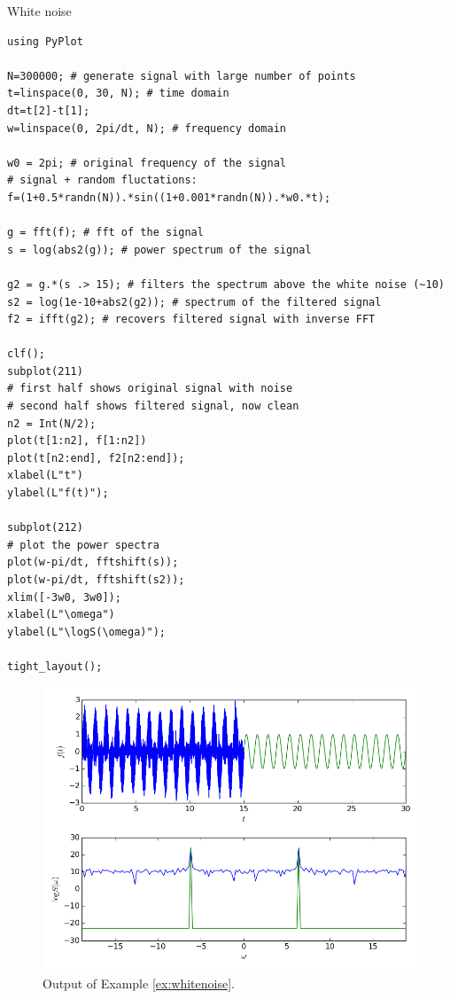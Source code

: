 \begin{example}{White noise}
\label{ex:whitenoise}
\begin{verbatim}
using PyPlot

N=300000; # generate signal with large number of points
t=linspace(0, 30, N); # time domain
dt=t[2]-t[1];
w=linspace(0, 2pi/dt, N); # frequency domain

w0 = 2pi; # original frequency of the signal
# signal + random fluctations:
f=(1+0.5*randn(N)).*sin((1+0.001*randn(N)).*w0.*t); 

g = fft(f); # fft of the signal
s = log(abs2(g)); # power spectrum of the signal

g2 = g.*(s .> 15); # filters the spectrum above the white noise (~10)
s2 = log(1e-10+abs2(g2)); # spectrum of the filtered signal
f2 = ifft(g2); # recovers filtered signal with inverse FFT

clf();
subplot(211)
# first half shows original signal with noise
# second half shows filtered signal, now clean
n2 = Int(N/2);
plot(t[1:n2], f[1:n2])
plot(t[n2:end], f2[n2:end]);
xlabel(L"t")
ylabel(L"f(t)");

subplot(212)
# plot the power spectra
plot(w-pi/dt, fftshift(s));
plot(w-pi/dt, fftshift(s2));
xlim([-3w0, 3w0]);
xlabel(L"\omega")
ylabel(L"\logS(\omega)");

tight_layout();
\end{verbatim}
\end{example}

\begin{figure}[ht!]
 \centering
 \includegraphics[width=14cm,keepaspectratio=true]{./whitenoise.png}
 \caption{Output of Example \ref{ex:whitenoise}.}
 \label{fig:whitenoise}
\end{figure}

